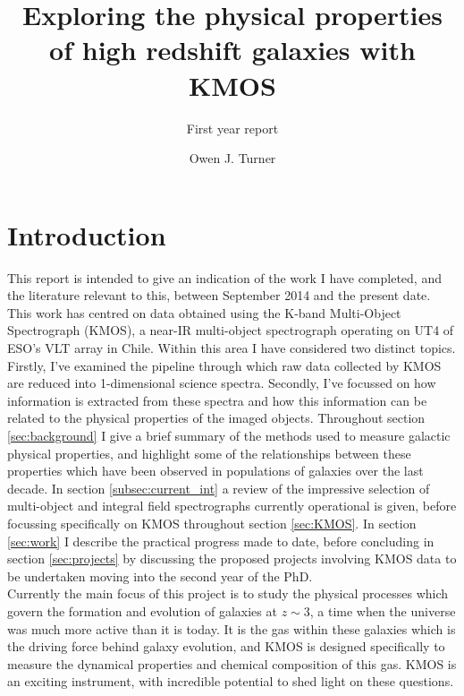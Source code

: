 \documentclass{literature}
\title{Exploring the physical properties of high redshift galaxies with KMOS}
\subtitle{First year report}
\author{Owen J. Turner}
\begin{document}
\coverpage





\section{Introduction}\label{sec:Intro}
This report is intended to give an indication of the work I have completed, and the literature relevant to this, between September 2014 and the present date. This work has centred on data obtained using the K-band Multi-Object Spectrograph (KMOS), a near-IR multi-object spectrograph operating on UT4 of ESO's VLT array in Chile. Within this area I have considered two distinct topics. Firstly, I've examined the pipeline through which raw data collected by KMOS are reduced into 1-dimensional science spectra. Secondly, I've focussed on how information is extracted from these spectra and how this information can be related to the physical properties of the imaged objects. Throughout section \ref{sec:background} I give a brief summary of the methods used to measure galactic physical properties, and highlight some of the relationships between these properties which have been observed in populations of galaxies over the last decade. In section \ref{subsec:current_int} a review of the impressive selection of multi-object and integral field spectrographs currently operational is given, before focussing specifically on KMOS throughout section \ref{sec:KMOS}. In section \ref{sec:work} I describe the practical progress made to date, before concluding in section \ref{sec:projects} by discussing the proposed projects involving KMOS data to be undertaken moving into the second year of the PhD. \\    


Currently the main focus of this project is to study the physical processes which govern the formation and evolution of galaxies at $z \sim 3$, a time when the universe was much more active than it is today. It is the gas within these galaxies which is the driving force behind galaxy evolution, and KMOS is designed specifically to measure the dynamical properties and chemical composition of this gas. KMOS is an exciting instrument, with incredible potential to shed light on these questions.   \\ 
\end{document}
